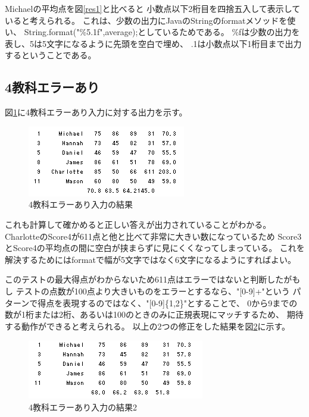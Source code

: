 \documentclass[dvipdfmx]{jsarticle}
\begin{document}
Michaelの平均点を図\ref{res1}と比べると
小数点以下2桁目を四捨五入して表示していると考えられる。
これは、少数の出力にJavaのStringのformatメソッドを使い、
String.format("\%5.1f",average);としているためである。
\%fは少数の出力を表し、5は5文字になるように先頭を空白で埋め、
.1は小数点以下1桁目まで出力するということである。

\subsection{4教科エラーあり}
図\ref{res2}に4教科エラーあり入力に対する出力を示す。
\begin{figure}[H]
  \centering
  \includegraphics[width=0.6\hsize]{../pic/res2.png}
  \caption{4教科エラーあり入力の結果}
  \label{res2}
\end{figure}

これも計算して確かめると正しい答えが出力されていることがわかる。
CharlotteのScore4が611点と他と比べて非常に大きい数になっているため
Score3とScore4の平均点の間に空白が挟まらずに見にくくなってしまっている。
これを解決するためにはformatで幅が5文字ではなく6文字になるようにすればよい。

このテストの最大得点がわからないため611点はエラーではないと判断したがもし
テストの点数が100点より大きいものをエラーとするなら、"[0-9]+"という
パターンで得点を表現するのではなく、"[0-9]\{1,2\}"とすることで、
0から9までの数が1桁または2桁、あるいは100のときのみに正規表現にマッチするため、
期待する動作ができると考えられる。
以上の2つの修正をした結果を図\ref{res2_2}に示す。
\begin{figure}[H]
  \centering
  \includegraphics[width=0.7\hsize]{../pic/res2_2.png}
  \caption{4教科エラーあり入力の結果2}
  \label{res2_2}
\end{figure}
\end{document}

